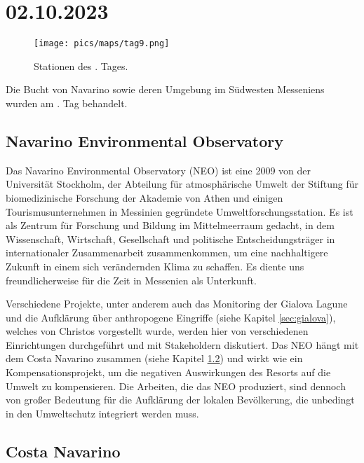 \documentclass[preprint]{geomorphica} %
\begin{document}

\newpage

\section{02.10.2023}

\begin{figure}[!h]
    \centering
    \texttt{[image: pics/maps/tag9.png]}
    \caption{Stationen des \theday. Tages.}
    \label{pic:tag9}
\end{figure}

Die Bucht von Navarino sowie deren Umgebung im Südwesten Messeniens wurden am \theday. Tag behandelt.

\subsection{Navarino Environmental Observatory}
\label{sec:neo}

Das Navarino Environmental Observatory (NEO) ist eine 2009 von der Universität Stockholm, der Abteilung für atmosphärische Umwelt der Stiftung für biomedizinische Forschung der Akademie von Athen und einigen Tourismusunternehmen in Messinien gegründete Umweltforschungsstation. Es ist als Zentrum für Forschung und Bildung im Mittelmeerraum gedacht, in dem Wissenschaft, Wirtschaft, Gesellschaft und politische Entscheidungsträger in internationaler Zusammenarbeit zusammenkommen, um eine nachhaltigere Zukunft in einem sich verändernden Klima zu schaffen. Es diente uns freundlicherweise für die Zeit in Messenien als Unterkunft.

Verschiedene Projekte, unter anderem auch das Monitoring der Gialova Lagune und die Aufklärung über anthropogene Eingriffe (siehe Kapitel \ref{sec:gialova}), welches von Christos vorgestellt wurde, werden hier von verschiedenen Einrichtungen durchgeführt und mit Stakeholdern diskutiert. Das NEO hängt mit dem Costa Navarino zusammen (siehe Kapitel \ref{sec:costa}) und wirkt wie ein Kompensationsprojekt, um die negativen Auswirkungen des Resorts auf die Umwelt zu kompensieren. Die Arbeiten, die das NEO produziert, sind dennoch von großer Bedeutung für die Aufklärung der lokalen Bevölkerung, die unbedingt in  den Umweltschutz integriert werden muss.

\subsection{Costa Navarino}
\label{sec:costa}
\end{document}
